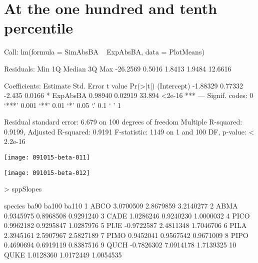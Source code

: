 \documentclass{article}
\begin{document}
\newpage
\section{At the one hundred and tenth percentile}
\begin{Schunk}
\begin{Soutput}
Call:
lm(formula = SimAbsBA ~ ExpAbsBA, data = PlotMeans)

Residuals:
     Min       1Q   Median       3Q      Max 
-26.2569   0.5016   1.8413   1.9484  12.6616 

Coefficients:
            Estimate Std. Error t value Pr(>|t|)    
(Intercept) -1.88329    0.77332  -2.435   0.0166 *  
ExpAbsBA     0.98940    0.02919  33.894   <2e-16 ***
---
Signif. codes:  0 ‘***’ 0.001 ‘**’ 0.01 ‘*’ 0.05 ‘.’ 0.1 ‘ ’ 1

Residual standard error: 6.679 on 100 degrees of freedom
Multiple R-squared:  0.9199,	Adjusted R-squared:  0.9191 
F-statistic:  1149 on 1 and 100 DF,  p-value: < 2.2e-16
\end{Soutput}
\end{Schunk}
\texttt{[image: 091015-beta-011]}

\texttt{[image: 091015-beta-012]}
\begin{Schunk}
\begin{Sinput}
>   sppSlopes
\end{Sinput}
\begin{Soutput}
   species       ba90     ba100     ba110
1     ABCO  3.0700509 2.8679859 3.2140277
2     ABMA  0.9345975 0.8968508 0.9291240
3     CADE  1.0286246 0.9240230 1.0000032
4     PICO  0.9962182 0.9295847 1.0287976
5     PIJE -0.9722587 2.4811348 1.7046706
6     PILA  2.3945161 2.5907967 2.5827189
7     PIMO  0.9452041 0.9567542 0.9671009
8     PIPO  0.4690694 0.6919119 0.8387516
9     QUCH -0.7826302 7.0914178 1.7139325
10    QUKE  1.0128360 1.0172449 1.0054535
\end{Soutput}
\end{Schunk}






\newpage
\end{document}
